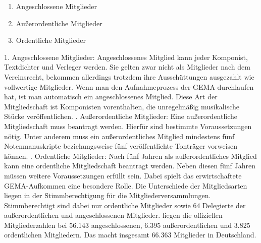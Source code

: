 \begin{enumerate}
\item Angeschlossene Mitglieder
\item Außerordentliche Mitglieder
\item Ordentliche Mitglieder
\end{enumerate}

1. Angeschlossene Mitglieder:
\newline
Angeschlossenes Mitglied kann jeder Komponist, Textdichter und Verleger werden. Sie gelten zwar nicht als Mitglieder nach dem Vereinsrecht, bekommen allerdings trotzdem ihre Ausschüttungen ausgezahlt wie vollwertige Mitglieder. Wenn man den Aufnahmeprozess der GEMA durchlaufen hat, ist man automatisch ein angeschlossenes Mitglied. Diese Art der Mitgliedschaft ist Komponisten vorenthalten, die unregelmäßig musikalische Stücke veröffentlichen.
\newline
{}. Außerordentliche Mitglieder:
\newline
Eine außerordentliche Mitgliedschaft muss beantragt werden. Hierfür sind bestimmte Voraussetzungen nötig. Unter anderem muss ein außerordentliches Mitglied mindestens fünf Notenmanuskripte beziehungsweise fünf veröffentlichte Tonträger vorweisen können.
\newline
{}. Ordentliche Mitglieder:
\newline
Nach fünf Jahren als außerordentliches Mitglied kann eine ordentliche Mitgliedschaft beantragt werden. Neben diesen fünf Jahren müssen weitere Voraussetzungen erfüllt sein. Dabei spielt das erwirtschaftete GEMA-Aufkommen eine besondere Rolle. 
\newline 
\newline
Die Unterschiede der Mitgliedsarten liegen in der Stimmberechtigung für die Mitgliederversammlungen. Stimmberechtigt sind dabei nur ordentliche Mitglieder sowie 64 Delegierte der außerordentlichen und angeschlossenen Mitglieder.
 liegen die offiziellen Mitgliederzahlen bei 56.143 angeschlossenen, 6.395 außerordentlichen und 3.825 ordentlichen Mitgliedern. Das macht insgesamt 66.363 Mitglieder in Deutschland.

